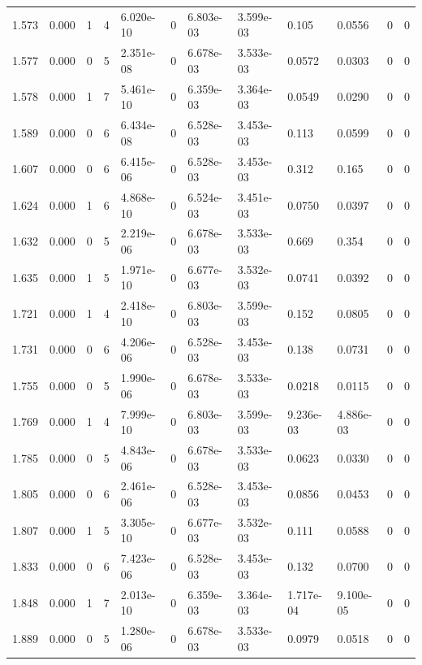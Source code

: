 \documentclass[preview]{standalone}
\begin{document}
{{{\begin{tabular}{L{1.2cm}C{1.2cm} C{0.3cm}C{0.5cm} C{1.4cm}C{1.4cm} C{1.4cm}C{1.4cm} C{1.6cm}C{1.6cm} C{1.6cm}C{1.6cm}}
  1.573  &  0.000  & 1     &  4 &  6.020e-10  & 0  &  6.803e-03&   3.599e-03& 0.105 & 0.0556   &  0 & 0  \\ 
  1.577  &  0.000  & 0     &  5 &  2.351e-08  & 0  &  6.678e-03&   3.533e-03& 0.0572 & 0.0303   &  0 & 0  \\ 
  1.578  &  0.000  & 1     &  7 &  5.461e-10  & 0  &  6.359e-03&   3.364e-03& 0.0549 & 0.0290   &  0 & 0  \\ 
  1.589  &  0.000  & 0     &  6 &  6.434e-08  & 0  &  6.528e-03&   3.453e-03& 0.113 & 0.0599   &  0 & 0  \\ 
  1.607  &  0.000  & 0     &  6 &  6.415e-06  & 0  &  6.528e-03&   3.453e-03& 0.312 & 0.165   &  0 & 0  \\ 
  1.624  &  0.000  & 1     &  6 &  4.868e-10  & 0  &  6.524e-03&   3.451e-03& 0.0750 & 0.0397   &  0 & 0  \\ 
  1.632  &  0.000  & 0     &  5 &  2.219e-06  & 0  &  6.678e-03&   3.533e-03& 0.669 & 0.354   &  0 & 0  \\ 
  1.635  &  0.000  & 1     &  5 &  1.971e-10  & 0  &  6.677e-03&   3.532e-03& 0.0741 & 0.0392   &  0 & 0  \\ 
  1.721  &  0.000  & 1     &  4 &  2.418e-10  & 0  &  6.803e-03&   3.599e-03& 0.152 & 0.0805   &  0 & 0  \\ 
  1.731  &  0.000  & 0     &  6 &  4.206e-06  & 0  &  6.528e-03&   3.453e-03& 0.138 & 0.0731   &  0 & 0  \\ 
  1.755  &  0.000  & 0     &  5 &  1.990e-06  & 0  &  6.678e-03&   3.533e-03& 0.0218 & 0.0115   &  0 & 0  \\ 
  1.769  &  0.000  & 1     &  4 &  7.999e-10  & 0  &  6.803e-03&   3.599e-03& 9.236e-03 & 4.886e-03   &  0 & 0  \\ 
  1.785  &  0.000  & 0     &  5 &  4.843e-06  & 0  &  6.678e-03&   3.533e-03& 0.0623 & 0.0330   &  0 & 0  \\ 
  1.805  &  0.000  & 0     &  6 &  2.461e-06  & 0  &  6.528e-03&   3.453e-03& 0.0856 & 0.0453   &  0 & 0  \\ 
  1.807  &  0.000  & 1     &  5 &  3.305e-10  & 0  &  6.677e-03&   3.532e-03& 0.111 & 0.0588   &  0 & 0  \\ 
  1.833  &  0.000  & 0     &  6 &  7.423e-06  & 0  &  6.528e-03&   3.453e-03& 0.132 & 0.0700   &  0 & 0  \\ 
  1.848  &  0.000  & 1     &  7 &  2.013e-10  & 0  &  6.359e-03&   3.364e-03& 1.717e-04 & 9.100e-05   &  0 & 0  \\ 
  1.889  &  0.000  & 0     &  5 &  1.280e-06  & 0  &  6.678e-03&   3.533e-03& 0.0979 & 0.0518   &  0 & 0  \\ 

\end{tabular}}}}
\end{document}
